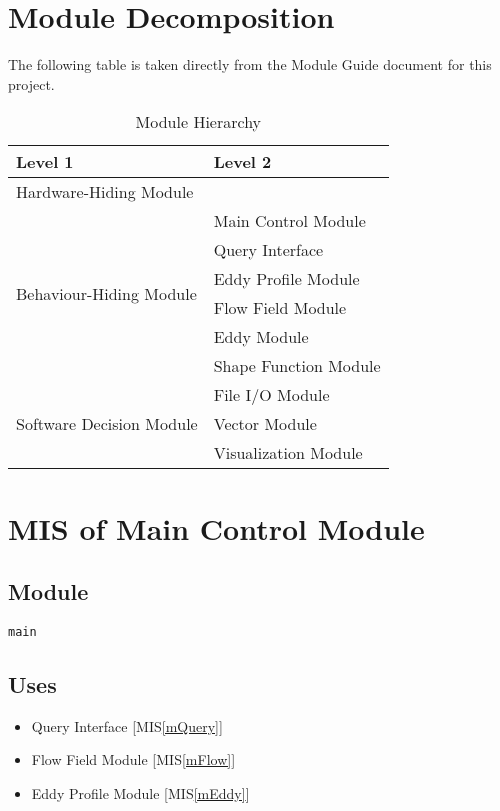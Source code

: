 \documentclass[12pt, titlepage]{article}
\begin{document}
\section{Module Decomposition} \label{SecMD}

The following table is taken directly from the Module Guide document for this project.
\begin{table}[h!]
  \centering
  \begin{tabular}{p{} p{}}
  \toprule
  \textbf{Level 1} & \textbf{Level 2}\\
  \midrule
  
  {Hardware-Hiding Module} & ~ \\
  \midrule
  
  \multirow{6}{0.3\textwidth}{Behaviour-Hiding Module}
  & Main Control Module\\
  & Query Interface\\
  & Eddy Profile Module\\
  & Flow Field Module\\
  & Eddy Module\\
  & Shape Function Module\\
  \midrule
  
  \multirow{3}{0.3\textwidth}{Software Decision Module} 
  & File I/O Module\\
  & Vector Module\\
  & Visualization Module\\
  \bottomrule

\end{tabular}
\caption{Module Hierarchy}
\label{TblMH}
\end{table}

\newpage
\section{MIS of Main Control Module} \label{mMain} 

\subsection{Module}
\texttt{main}

\subsection{Uses}
\begin{itemize}
\item Query Interface [MIS\ref{mQuery}]
\item Flow Field Module [MIS\ref{mFlow}]
\item Eddy Profile Module [MIS\ref{mEddy}]
\end{itemize}
\end{document}
